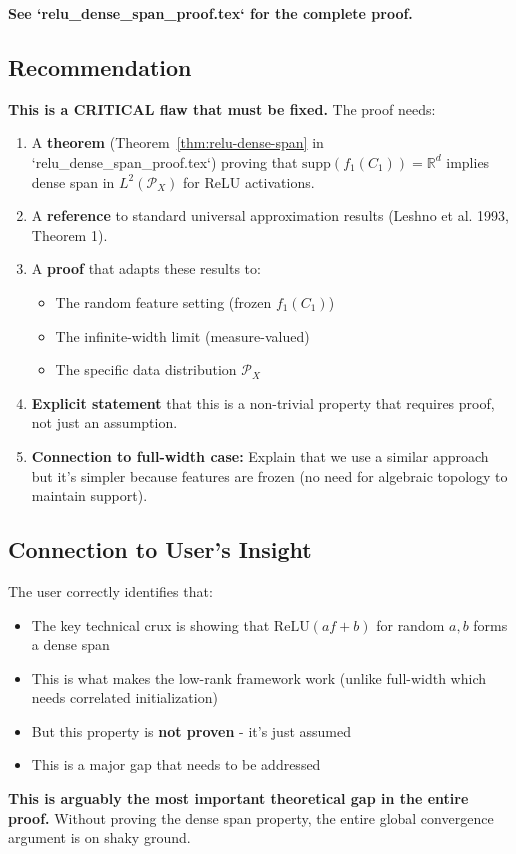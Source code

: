 \textbf{See `relu_dense_span_proof.tex` for the complete proof.}

\subsection{Recommendation}

\textbf{This is a CRITICAL flaw that must be fixed.} The proof needs:

\begin{enumerate}
\item A \textbf{theorem} (Theorem~\ref{thm:relu-dense-span} in `relu_dense_span_proof.tex`) proving that $\text{supp}(f_1(C_1)) = \mathbb{R}^d$ implies dense span in $L^2(\mathcal{P}_X)$ for ReLU activations.

\item A \textbf{reference} to standard universal approximation results (Leshno et al. 1993, Theorem 1).

\item A \textbf{proof} that adapts these results to:
\begin{itemize}
\item The random feature setting (frozen $f_1(C_1)$)
\item The infinite-width limit (measure-valued)
\item The specific data distribution $\mathcal{P}_X$
\end{itemize}

\item \textbf{Explicit statement} that this is a non-trivial property that requires proof, not just an assumption.

\item \textbf{Connection to full-width case:} Explain that we use a similar approach but it's simpler because features are frozen (no need for algebraic topology to maintain support).
\end{enumerate}

\subsection{Connection to User's Insight}

The user correctly identifies that:
\begin{itemize}
\item The key technical crux is showing that $\text{ReLU}(af+b)$ for random $a,b$ forms a dense span
\item This is what makes the low-rank framework work (unlike full-width which needs correlated initialization)
\item But this property is \textbf{not proven} - it's just assumed
\item This is a major gap that needs to be addressed
\end{itemize}

\textbf{This is arguably the most important theoretical gap in the entire proof.} Without proving the dense span property, the entire global convergence argument is on shaky ground.
